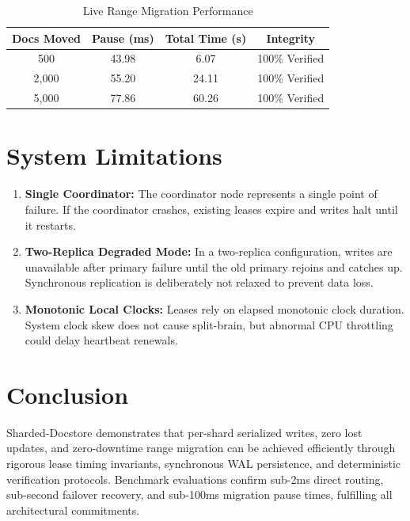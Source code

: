 \documentclass[10pt,journal,compsoc]{IEEEtran}
\begin{document}
\begin{table}[ht]
\centering
\caption{Live Range Migration Performance}
\label{tab:migration}
\begin{tabular}{cccc}
\toprule
\textbf{Docs Moved} & \textbf{Pause (ms)} & \textbf{Total Time (s)} & \textbf{Integrity} \\
\midrule
500   & 43.98 & 6.07  & 100\% Verified \\
2,000 & 55.20 & 24.11 & 100\% Verified \\
5,000 & 77.86 & 60.26 & 100\% Verified \\
\bottomrule
\end{tabular}
\end{table}

\section{System Limitations}
\begin{enumerate}
    \item \textbf{Single Coordinator:} The coordinator node represents a single point of failure. If the coordinator crashes, existing leases expire and writes halt until it restarts.
    \item \textbf{Two-Replica Degraded Mode:} In a two-replica configuration, writes are unavailable after primary failure until the old primary rejoins and catches up. Synchronous replication is deliberately not relaxed to prevent data loss.
    \item \textbf{Monotonic Local Clocks:} Leases rely on elapsed monotonic clock duration. System clock skew does not cause split-brain, but abnormal CPU throttling could delay heartbeat renewals.
\end{enumerate}

\section{Conclusion}
Sharded-Docstore demonstrates that per-shard serialized writes, zero lost updates, and zero-downtime range migration can be achieved efficiently through rigorous lease timing invariants, synchronous WAL persistence, and deterministic verification protocols. Benchmark evaluations confirm sub-2ms direct routing, sub-second failover recovery, and sub-100ms migration pause times, fulfilling all architectural commitments.
\end{document}
